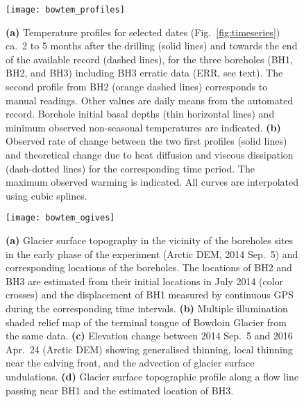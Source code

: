 \documentclass[utf8]{article}
\begin{document}
    \begin{figure}
      \centerline{\texttt{[image: bowtem\_profiles]}}
      \caption{%
        \textbf{(a)} Temperature profiles for selected dates
          (Fig.~\ref{fig:timeseries}) ca.~2 to 5 months after the drilling
          (solid lines) and towards the end of the available record (dashed
          lines), for the three boreholes (BH1, BH2, and BH3) including BH3
          erratic data (ERR, see text). The second profile from BH2 (orange
          dashed lines) corresponds to manual readings. Other values are daily
          means from the automated record. Borehole initial basal depths (thin
          horizontal lines) and minimum observed non-seasonal temperatures are
          indicated.
        \textbf{(b)} Observed rate of change between the two first profiles
          (solid lines) and theoretical change due to heat diffusion and
          viscous dissipation (dash-dotted lines) for the corresponding time
          period. The maximum observed warming is indicated. All curves are
          interpolated using cubic splines.}
      \label{fig:profiles}
    \end{figure}

    \begin{figure}
      \centerline{\texttt{[image: bowtem\_ogives]}}
      \caption{%
        \textbf{(a)} Glacier surface topography in the vicinity of the
          boreholes sites in the early phase of the experiment (Arctic DEM,
          2014 Sep.~5) and corresponding locations of the boreholes. The
          locations of BH2 and BH3 are estimated from their initial locations
          in July 2014 (color crosses) and the displacement of BH1 measured by
          continuous GPS during the corresponding time intervals.
        \textbf{(b)} Multiple illumination shaded relief map of the terminal
          tongue of Bowdoin Glacier from the same data.
        \textbf{(c)} Elevation change between 2014 Sep.~5 and 2016 Apr.~24
          (Arctic DEM) showing generalised thinning, local thinning near the
          calving front, and the advection of glacier surface undulations.
        \textbf{(d)} Glacier surface topographic profile along a flow line
          passing near BH1 and the estimated location of BH3.}
      \label{fig:ogives}
    \end{figure}


\clearpage
\linespread{1.25}  %
\end{document}
